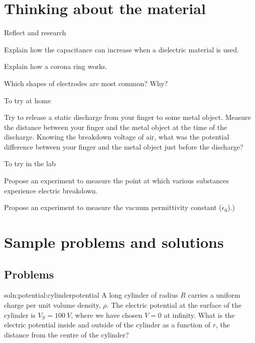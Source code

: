 \newpage
\section{Thinking about the material}

\begin{chapteractivity}{Reflect and research}
{
\item Explain how the capacitance can increase when a dielectric material is used.
\item Explain how a corona ring works.
\item Which shapes of electrodes are most common? Why?
}
\end{chapteractivity}

\begin{chapteractivity}{To try at home}
{
\item Try to release a static discharge from your finger to some metal object. Measure the distance between your finger and the metal object at the time of the discharge. Knowing the breakdown voltage of air, what was the potential difference between your finger and the metal object just before the discharge?
}
\end{chapteractivity}

\begin{chapteractivity}{To try in the lab}
{
\item Propose an experiment to measure the point at which various substances experience electric breakdown.
\item Propose an experiment to measure the vacuum permittivity constant ($\epsilon_0$).)
}
\end{chapteractivity}

\newpage
\section{Sample problems and solutions}

\subsection{Problems}
\begin{problem}{soln:potential:cylinderpotential}{\label{prob:potential:cylinderpotential} 
A long cylinder of radius $R$ carries a uniform charge per unit volume density, $\rho$. The electric potential at the surface of the cylinder is $V_S = \SI{100}{V}$, where we have chosen $V=0$ at infinity. What is the electric potential inside and outside of the cylinder as a function of $r$, the distance from the centre of the cylinder?}
\end{problem}

